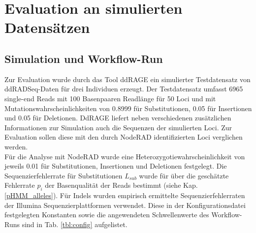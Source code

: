 \chapter{Evaluation an simulierten Datensätzen} \label{sec:eval}

\section{Simulation und Workflow-Run} \label{sec:sim}

Zur Evaluation wurde durch das Tool ddRAGE \cite{timm_2018, ddrage} ein simulierter Testdatensatz \cite{testdata} von ddRADSeq-Daten für drei Individuen erzeugt. Der Testdatensatz umfasst 6965 single-end Reads mit 100 Basenpaaren Readlänge für 50 Loci und mit Mutationswahrscheinlichkeiten von 0.8999 für Substitutionen, 0.05 für Insertionen und 0.05 für Deletionen. DdRAGE liefert neben verschiedenen zusätzlichen Informationen zur Simulation auch die Sequenzen der simulierten Loci. Zur Evaluation sollen diese mit den durch NodeRAD identifizierten Loci verglichen werden.\\

Für die Analyse mit NodeRAD wurde eine Heterozygotiewahrscheinlichkeit von jeweils 0.01 für Substitutionen, Insertionen und Deletionen festgelegt. Die Sequenzierfehlerrate für Substitutionen $L_{sub}$ wurde für über die geschätzte Fehlerrate $p_{i}$ der Basenqualität der Reads bestimmt (siehe Kap. \ref{pHMM_alleles}). Für Indels wurden empirisch ermittelte Sequenzierfehlerraten der Illumina Sequenzierplattformen \cite{schirmer_2016} verwendet. Diese in der Konfigurationsdatei festgelegten Konstanten sowie die angewendeten Schwellenwerte des Workflow-Runs sind in Tab. \ref{tbl:config} aufgelistet. \\


